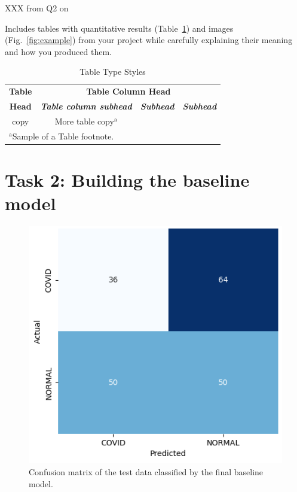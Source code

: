 \documentclass[conference]{IEEEtran}
\begin{document}
XXX from Q2 on

Includes tables with quantitative results (Table~\ref{table:example}) and images (Fig.~\ref{fig:example}) from your project while carefully explaining their meaning and how you produced them.
\begin{table}[htbp]
\caption{Table Type Styles}
\begin{center}
\begin{tabular}{|c|c|c|c|}
\hline
\textbf{Table}&\multicolumn{3}{|c|}{\textbf{Table Column Head}} \\
\cline{2-4} 
\textbf{Head} & \textbf{\textit{Table column subhead}}& \textbf{\textit{Subhead}}& \textbf{\textit{Subhead}} \\
\hline
copy& More table copy$^{\mathrm{a}}$& &  \\
\hline
\multicolumn{4}{l}{$^{\mathrm{a}}$Sample of a Table footnote.}
\end{tabular}
\label{table:example}
\end{center}
\end{table}


\section{Task 2: Building the baseline model}\label{sec:task_2}

\begin{figure}[h] \centering 						\includegraphics[width=0.9\columnwidth]{fig_task2_confusionmatrix.png} 
	\caption{Confusion matrix of the test data classified by the final baseline model.} 
	\label{fig:task2_confusionmatrix} 
\end{figure}
\end{document}
